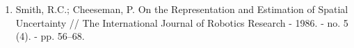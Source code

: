 \begin{enumerate}
    
    \item \label{itm:cheeseman} Smith, R.C.; Cheeseman, P. On the Representation and Estimation of Spatial Uncertainty // The International Journal of Robotics Research - 1986. - no. 5 (4). - pp. 56–68.
\end{enumerate}

\newpage

